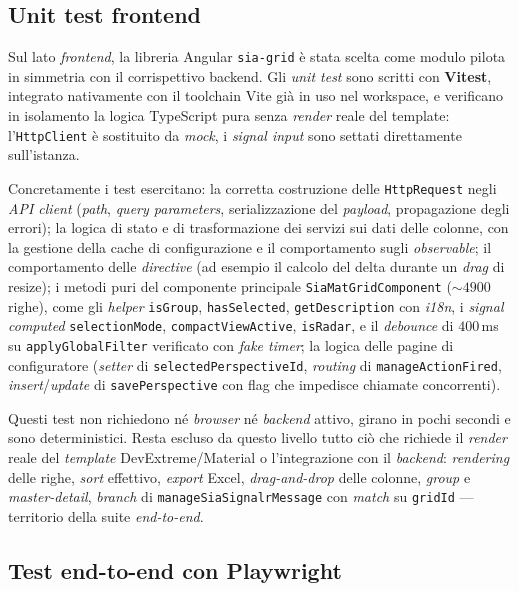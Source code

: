\subsection{Unit test frontend}

Sul lato \emph{frontend}, la libreria Angular \texttt{sia-grid} è stata scelta come
modulo pilota in simmetria con il corrispettivo backend. Gli \emph{unit test} sono
scritti con \textbf{Vitest}, integrato nativamente con il toolchain Vite già in
uso nel workspace, e verificano in isolamento la logica TypeScript pura senza
\emph{render} reale del template: l'\texttt{HttpClient} è sostituito da \emph{mock},
i \emph{signal input} sono settati direttamente sull'istanza.

Concretamente i test esercitano: la corretta costruzione delle \texttt{HttpRequest}
negli \emph{API client} (\emph{path}, \emph{query parameters}, serializzazione del
\emph{payload}, propagazione degli errori); la logica di stato e di trasformazione
dei servizi sui dati delle colonne, con la gestione della cache di configurazione e
il comportamento sugli \emph{observable}; il comportamento delle \emph{directive}
(ad esempio il calcolo del delta durante un \emph{drag} di resize); i metodi puri
del componente principale \texttt{SiaMatGridComponent} ($\sim$$4900$ righe), come
gli \emph{helper} \texttt{isGroup}, \texttt{hasSelected}, \texttt{getDescription}
con \emph{i18n}, i \emph{signal computed} \texttt{selectionMode},
\texttt{compactViewActive}, \texttt{isRadar}, e il \emph{debounce} di $400$\,ms su
\texttt{applyGlobalFilter} verificato con \emph{fake timer}; la logica delle pagine
di configuratore (\emph{setter} di \texttt{selectedPerspectiveId}, \emph{routing} di
\texttt{manageActionFired}, \emph{insert}/\emph{update} di \texttt{savePerspective}
con flag che impedisce chiamate concorrenti).

Questi test non richiedono né \emph{browser} né \emph{backend} attivo, girano in
pochi secondi e sono deterministici. Resta escluso da questo livello tutto ciò che
richiede il \emph{render} reale del \emph{template} DevExtreme/Material o
l'integrazione con il \emph{backend}: \emph{rendering} delle righe, \emph{sort}
effettivo, \emph{export} Excel, \emph{drag-and-drop} delle colonne, \emph{group} e
\emph{master-detail}, \emph{branch} di \texttt{manageSiaSignalrMessage} con
\emph{match} su \texttt{gridId} --- territorio della suite \emph{end-to-end}.

\subsection{Test end-to-end con Playwright}

